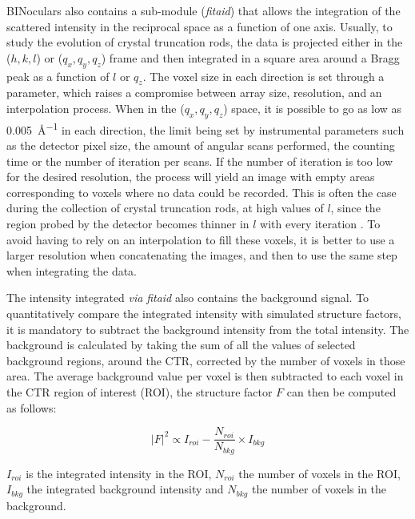 BINoculars also contains a sub-module (\textit{fitaid}) that allows the integration of the scattered intensity in the reciprocal space as a function of one axis.
Usually, to study the evolution of crystal truncation rods, the data is projected either in the ($h, k, l$) or ($q_x, q_y, q_z$) frame and then integrated in a square area around a Bragg peak as a function of $l$ or $q_z$.
The voxel size in each direction is set through a parameter, which raises a compromise between array size, resolution, and an interpolation process.
When in the ($q_x, q_y, q_z$) space, it is possible to go as low as \qty{0.005}{\angstrom^{-1}} in each direction, the limit being set by instrumental parameters such as the detector pixel size, the amount of angular scans performed, the counting time or the number of iteration per scans.
If the number of iteration is too low for the desired resolution, the process will yield an image with empty areas corresponding to voxels where no data could be recorded.
This is often the case during the collection of crystal truncation rods, at high values of $l$, since the region probed by the detector becomes thinner in $l$ with every iteration \parencite{Drnec2014}.
To avoid having to rely on an interpolation to fill these voxels, it is better to use a larger resolution when concatenating the images, and then to use the same step when integrating the data.

The intensity integrated \textit{via} \textit{fitaid} also contains the background signal.
To quantitatively compare the integrated intensity with simulated structure factors, it is mandatory to subtract the background intensity from the total intensity.
The background is calculated by taking the sum of all the values of selected background regions, around the CTR, corrected by the number of voxels in those area.
The average background value per voxel is then subtracted to each voxel in the CTR region of interest (ROI), the structure factor $F$ can then be computed as follows:

\begin{equation}
    |F|^2 \propto I_{roi} - \frac{N_{roi}}{N_{bkg}} \times I_{bkg}
\end{equation}

$I_{roi}$ is the integrated intensity in the ROI, $N_{roi}$ the number of voxels in the ROI, $I_{bkg}$ the integrated background intensity and $N_{bkg}$ the number of voxels in the background.

